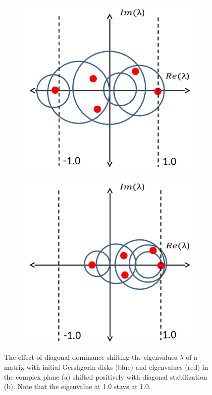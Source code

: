 \begin{figure}[h!]
	\centering
	\begin{subfigure}{0.45\textwidth}
		\centering
		\includegraphics[width=\linewidth]{figures/convergence/eig_before.png}
		\caption{}
		\label{fig:eig-before}
	\end{subfigure}
	\begin{subfigure}{0.45\textwidth}
		\centering
		\includegraphics[width=\linewidth]{figures/convergence/eig_after.png}
		\caption{}
		\label{fig:eig-after}
	\end{subfigure}
	\caption[]{The effect of diagonal dominance shifting the eigenvalues $\lambda$ of a matrix with initial Gershgorin disks (blue) and eigenvalues (red) in the complex plane (a) shifted positively with diagonal stabilization (b). Note that the eigenvalue at 1.0 stays at 1.0.}
	\label{fig:eig-shift}
\end{figure}

